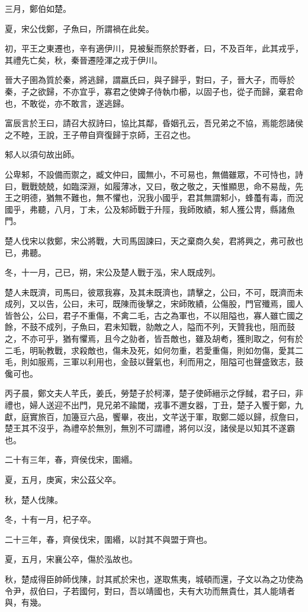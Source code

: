 \begin{pinyinscope}
三月，鄭伯如楚。

夏，宋公伐鄭，子魚曰，所謂禍在此矣。

初，平王之東遷也，辛有適伊川，見被髮而祭於野者，曰，不及百年，此其戎乎，其禮先亡矣，秋，秦晉遷陸渾之戎于伊川。

晉大子圉為質於秦，將逃歸，謂嬴氏曰，與子歸乎，對曰，子，晉大子，而辱於秦，子之欲歸，不亦宜乎，寡君之使婢子侍執巾櫛，以固子也，從子而歸，棄君命也，不敢從，亦不敢言，遂逃歸。

富辰言於王曰，請召大叔詩曰，協比其鄰，昏姻孔云，吾兄弟之不協，焉能怨諸侯之不睦，王說，王子帶自齊復歸于京師，王召之也。

邾人以須句故出師。

公卑邾，不設備而禦之，臧文仲曰，國無小，不可易也，無備雖眾，不可恃也，詩曰，戰戰兢兢，如臨深淵，如履薄冰，又曰，敬之敬之，天惟顯思，命不易哉，先王之明德，猶無不難也，無不懼也，況我小國乎，君其無謂邾小，蜂蠆有毒，而況國乎，弗聽，八月，丁未，公及邾師戰于升陘，我師敗績，邾人獲公冑，縣諸魚門。

楚人伐宋以救鄭，宋公將戰，大司馬固諫曰，天之棄商久矣，君將興之，弗可赦也已，弗聽。

冬，十一月，己已，朔，宋公及楚人戰于泓，宋人既成列。

楚人未既濟，司馬曰，彼眾我寡，及其未既濟也，請擊之，公曰，不可，既濟而未成列，又以告，公曰，未可，既陳而後擊之，宋師敗績，公傷股，門官殲焉，國人皆咎公，公曰，君子不重傷，不禽二毛，古之為軍也，不以阻隘也，寡人雖亡國之餘，不鼓不成列，子魚曰，君未知戰，勍敵之人，隘而不列，天贊我也，阻而鼓之，不亦可乎，猶有懼焉，且今之勍者，皆吾敵也，雖及胡耇，獲則取之，何有於二毛，明恥教戰，求殺敵也，傷未及死，如何勿重，若愛重傷，則如勿傷，愛其二毛，則如服焉，三軍以利用也，金鼓以聲氣也，利而用之，阻隘可也聲盛致志，鼓儳可也。

丙子晨，鄭文夫人芊氏，姜氏，勞楚子於柯澤，楚子使師縉示之俘馘，君子曰，非禮也，婦人送迎不出門，見兄弟不踰閾，戎事不邇女器，丁丑，楚子入饗于鄭，九獻，庭實旅百，加籩豆六品，饗畢，夜出，文芊送于軍，取鄭二姬以歸，叔詹曰，楚王其不沒乎，為禮卒於無別，無別不可謂禮，將何以沒，諸侯是以知其不遂霸也。

二十有三年，春，齊侯伐宋，圍緡。

夏，五月，庚寅，宋公茲父卒。

秋，楚人伐陳。

冬，十有一月，杞子卒。

二十三年，春，齊侯伐宋，圍緡，以討其不與盟于齊也。

夏，五月，宋襄公卒，傷於泓故也。

秋，楚成得臣帥師伐陳，討其貳於宋也，遂取焦夷，城頓而還，子文以為之功使為令尹，叔伯曰，子若國何，對曰，吾以靖國也，夫有大功而無貴仕，其人能靖者與，有幾。


\end{pinyinscope}
